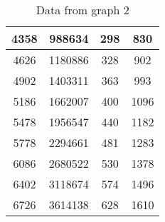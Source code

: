 \begin{table}[H]
\begin{tabular}{ |c|c|c|c| }
\hline
4358 & 988634 & 298 & 830 \\
\hline
4626 & 1180886 & 328 & 902 \\
\hline
4902 & 1403311 & 363 & 993 \\
\hline
5186 & 1662007 & 400 & 1096 \\
\hline
5478 & 1956547 & 440 & 1182 \\
\hline
5778 & 2294661 & 481 & 1283 \\
\hline
6086 & 2680522 & 530 & 1378 \\
\hline
6402 & 3118674 & 574 & 1496 \\
\hline
6726 & 3614138 & 628 & 1610 \\
\hline
\end{tabular}
\caption{Data from graph 2}
\end{table}

